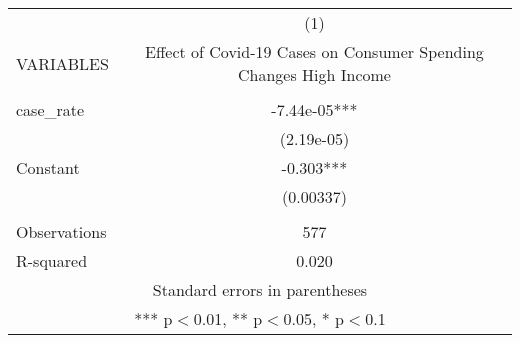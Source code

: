 \documentclass[]{article}
\begin{document}
\begin{tabular}{lc} \hline
 & (1) \\
VARIABLES & Effect of Covid-19 Cases on Consumer Spending Changes High Income \\ \hline
 &  \\
case\_rate & -7.44e-05*** \\
 & (2.19e-05) \\
Constant & -0.303*** \\
 & (0.00337) \\
 &  \\
Observations & 577 \\
 R-squared & 0.020 \\ \hline
\multicolumn{2}{c}{ Standard errors in parentheses} \\
\multicolumn{2}{c}{ *** p$<$0.01, ** p$<$0.05, * p$<$0.1} \\
\end{tabular}
\end{document}
